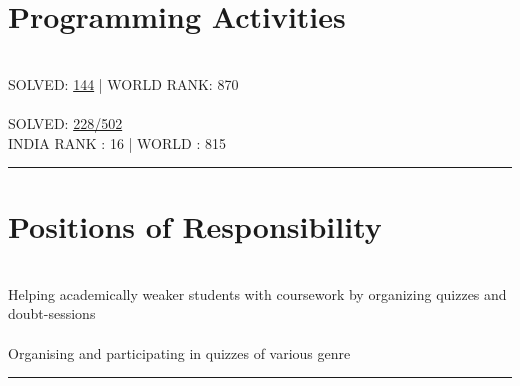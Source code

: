 \documentclass[letterpaper]{Formatting}
\begin{document}
\begin{minipage}[t]{0.3\textwidth}
\section{Programming Activities}
\\\vspace{0.5ex}
\small\uppercase {Solved: }\href{http://www.spoj.com/users/rbavishi/}{144} | \uppercase{World Rank: 870}\\
\vspace{2ex}
\\\vspace{0.5ex}
\small \uppercase{Solved: }\href{https://projecteuler.net/profile/RJBavishi.png}{228/502} \\
\small \uppercase{India Rank : 16 | World : 815}
\vspace{1ex}
\rule{5cm}{0.5pt}
\vspace{2ex}


\section{Positions of Responsibility}
\\
\vspace{1ex}
\footnotesize \textbullet{} Helping academically weaker students with coursework by organizing quizzes and doubt-sessions\\
\vspace{3ex}
\\
\vspace{1ex}
\footnotesize \textbullet{} Organising and participating in quizzes of various genre\\
\vspace{1ex}
\rule{5cm}{0.5pt}
\end{minipage} %
\hfill
\vrule
\hspace{3ex}
%
%
\end{document}
